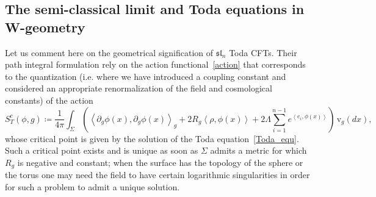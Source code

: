 \documentclass[10pt]{amsart}
\theoremstyle{definition}\newtheorem{defi}[theo]{Definition}\newtheorem{rema}[theo]{Remark}\newtheorem{exam}[theo]{Example}\newtheorem{exem}[theo]{Example}\newtheorem{nota}[theo]{Notation}
\newcommand{\frksl}{\mathfrak{sl}}
\newcommand{\rmv}{\mathrm{v}}
\newcommand*\green[1]{#1}
\begin{document}
\subsection{The semi-classical limit and Toda equations in W-geometry}\label{semi-classical}
Let us comment here on the geometrical signification of $\frksl_n$ Toda CFTs. Their path integral formulation rely on the action functional~\eqref{action} that corresponds to the quantization (i.e. where we have introduced a coupling constant and considered an appropriate renormalization of the field and cosmological constants) of the action
\[
S^c_T(\green\phi,g)\coloneqq \frac{1}{4\pi} \int_{\Sigma} \left(\left\langle\partial_g \phi(x), \partial_g \phi(x) \right\rangle_g +2 R_g \left\langle \rho, \phi(x) \right\rangle +2\Lambda \sum_{i=1}^{n-1} e^{\left\langle e_i,\phi(x) \right\rangle} \right)\,\rmv_{g}(dx),
\]
whose critical point is given by the solution of the Toda equation~\eqref{Toda_equ}. Such a critical point exists and is unique as soon as $\Sigma$ admits a metric for which $R_g$ is negative and constant; when the surface has the topology of the sphere or the torus one may need the field to have certain logarithmic singularities in order for such a problem to admit a unique solution.
\end{document}
